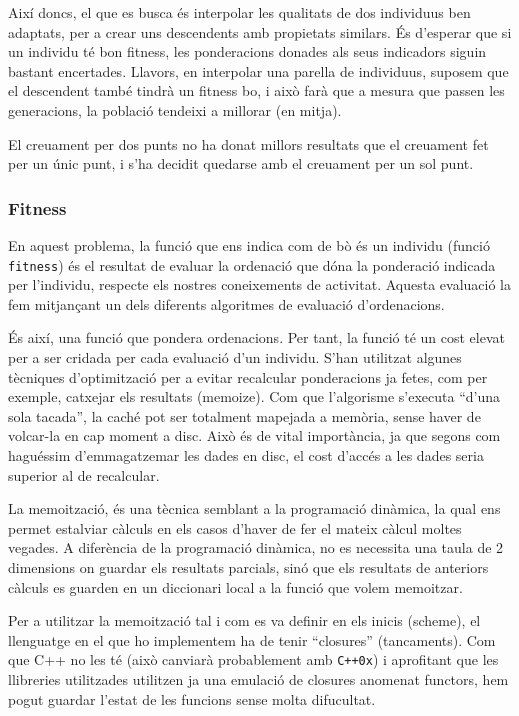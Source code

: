 \documentclass[titlepage,a4paper,12pt]{book}
\begin{document}
Així doncs, el que es busca és interpolar les qualitats de dos individuus ben
adaptats, per a crear uns descendents amb propietats similars.  És d'esperar que
si un individu té bon fitness, les ponderacions donades als seus indicadors
siguin bastant encertades.  Llavors, en interpolar una parella de individuus,
suposem que el descendent també tindrà un fitness bo, i això farà que a mesura
que passen les generacions, la població tendeixi a millorar (en mitja).

El creuament per dos punts no ha donat millors resultats que el creuament fet
per un únic punt, i s'ha decidit quedarse amb el creuament per un sol punt.


\subsubsection{Fitness} %
\label{ssub:Fitness}
En aquest problema, la funció que ens indica com de bò és un individu (funció
\texttt{fitness}) és el resultat de evaluar la ordenació que dóna la ponderació
indicada per l'individu, respecte els nostres coneixements de activitat. Aquesta
evaluació la fem mitjançant un dels diferents algoritmes de evaluació d'ordenacions.


És així, una funció que pondera ordenacions.  Per tant, la funció té un cost
elevat per a ser cridada per cada evaluació d'un individu.  S'han utilitzat
algunes tècniques d'optimització per a evitar recalcular ponderacions ja fetes,
com per exemple, catxejar els resultats (memoize).  Com que l'algorisme
s'executa ``d'una sola tacada'', la caché pot ser totalment mapejada a memòria,
sense haver de volcar-la en cap moment a disc.  Això és de vital importància, ja
que segons com haguéssim d'emmagatzemar les dades en disc, el cost d'accés a les
dades seria superior al de recalcular. 

La memoització, és una tècnica semblant a la programació dinàmica, la qual ens
permet estalviar càlculs en els casos d'haver de fer el mateix càlcul moltes
vegades.  A diferència de la programació dinàmica, no es necessita una taula de
2 dimensions on guardar els resultats parcials, sinó que els resultats de
anteriors càlculs es guarden en un diccionari local a la funció que volem
memoitzar.  

Per a utilitzar la memoització tal i com es va definir en els inicis
(scheme), el llenguatge en el que ho implementem ha de tenir ``closures''
(tancaments).  Com que C++ no les té (això canviarà probablement amb
\texttt{C++0x}) %
i aprofitant que les llibreries utilitzades utilitzen ja una emulació de
closures anomenat functors, hem pogut guardar l'estat de les funcions sense
molta difucultat. 
\end{document}
